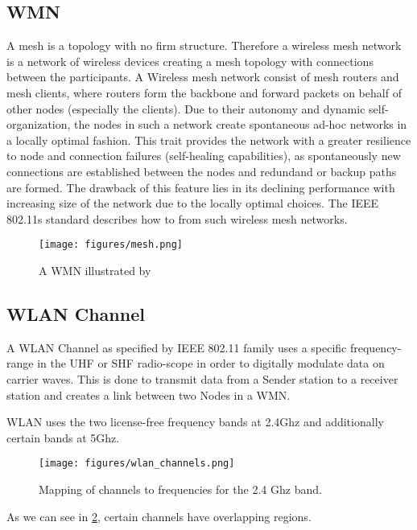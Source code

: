   \subsection{\ac{WMN}}
    A mesh is a topology with no firm structure. Therefore a wireless mesh network is a network of wireless devices creating a mesh topology with connections between the participants.
    A Wireless mesh network consist of mesh routers and mesh clients, where routers form the backbone and forward packets on behalf of other nodes (especially the clients).
    Due to their autonomy and dynamic self-organization, the nodes in such a network create spontaneous ad-hoc networks in a locally optimal fashion.
    This trait provides the network with a greater resilience to node and connection failures (self-healing capabilities), 
    as spontaneously new connections are established between the nodes and redundand or backup paths are formed. 
    The drawback of this feature lies in its declining performance with increasing size of the network due to the locally optimal choices.
    The IEEE 802.11s standard describes how to from such wireless mesh networks. \cite{GRH_WLANMeshStandard_IEEEWiCom2010} 
    \begin{figure}[th!]
      \centering
      \texttt{[image: figures/mesh.png]}
      \caption{A \ac{WMN} illustrated by \cite{Akyildiz2005445}}
      \label{fig:mesh}
    \end{figure}
    
  \subsection{\ac{WLAN} Channel}
    A \ac{WLAN} Channel as specified by IEEE 802.11 family uses a specific frequency-range in the \ac{UHF} or \ac{SHF} radio-scope in order to digitally modulate data on carrier waves.
    This is done to transmit data from a Sender station to a receiver station and creates a link between two Nodes in a \ac{WMN}. 
    
    \ac{WLAN} uses the two license-free frequency bands at 2.4Ghz and additionally certain bands at 5Ghz.
    \begin{figure}[th!]
      \centering
      \texttt{[image: figures/wlan\_channels.png]}
      \caption{Mapping of channels to frequencies for the 2.4 Ghz band. \cite{wlan_channels}}
      \label{fig:wlan_channels}
    \end{figure}
    As we can see in \ref{fig:wlan_channels}, certain channels have overlapping regions.
    
